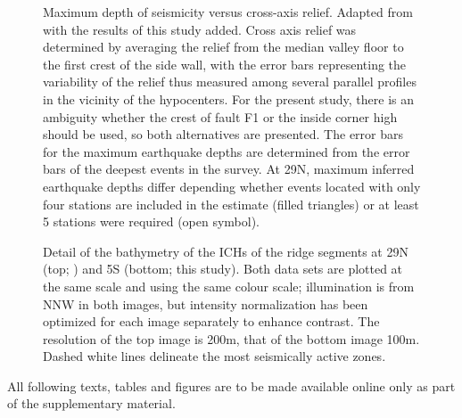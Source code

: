 \documentclass[aguplus]{aguplus}
\renewcommand{\includefig}[2]{}
\begin{document}
\begin{article}
\clearpage

\begin{figure}
\includefig{maxdep-topo/maxdep-topo}{20pc} %

\caption{Maximum depth of seismicity versus cross-axis relief. Adapted from
  \protect\citet{barclay01} with the results of this study added.
Cross axis relief was determined by averaging the relief from the median valley
floor to the first crest of the side wall, with the error bars representing the
variability of the relief thus measured among several parallel profiles in the
vicinity of the hypocenters.  For the present study, there is an
ambiguity whether the crest of fault F1 or the inside corner high should be used,
so both alternatives are presented.  The error bars for the maximum earthquake depths
are determined from the error bars of the deepest events in the
survey. At 29\dg N, maximum inferred earthquake depths differ
depending whether events located with only four stations are included
in the estimate (filled triangles) or at least 5 stations were
required (open symbol).}
\label{fig:maxdep-topo}
\end{figure}

\clearpage

\begin{figure}
\includefig{topo-cmp/topo-cmp}{20pc} %
\caption{Detail of the bathymetry of the ICHs of the ridge segments at
29\dg N (top; \citet{wolfe95}) and 5\dg S (bottom; this study).  Both
data sets are plotted at the same scale and using the same colour
scale; illumination is from NNW in both images, but intensity
normalization  has been optimized for each image separately to enhance contrast.  The resolution of the top image is 200m, that of
the bottom image 100m.
Dashed white
lines delineate the most seismically active zones.}
\label{fig:topo-cmp}
\end{figure}

\end{article}
\clearpage


\vspace*{10cm}
All following texts, tables and figures are to be made available online only
as part of the supplementary material.
\clearpage
\setcounter{figure}{0}
\renewcommand{\thefigure}{A\arabic{figure}}

\setcounter{table}{0}
\renewcommand{\thetable}{A\arabic{table}}
\end{document}

